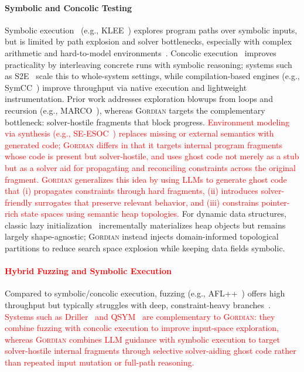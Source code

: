 \documentclass[acmsmall,screen,nonacm]{acmart}
\newcommand{\rev}[1]{\textcolor{red}{#1}}
\newcommand{\rev}[1]{#1}
\newcommand{\projName}{\textsc{Gordian}\xspace}
\theoremstyle{definition}
\begin{document}
\paragraph*{Symbolic and Concolic Testing} Symbolic execution~\cite{king1976symbolic} (e.g., KLEE~\cite{klee}) explores program paths over symbolic inputs, but is limited by path explosion and solver bottlenecks, especially with complex arithmetic and hard-to-model environments~\cite{env_modeling,autobug}. Concolic execution~\cite{dart} improves practicality by interleaving concrete runs with symbolic reasoning; systems such as S2E~\cite{s2e} scale this to whole-system settings, while compilation-based engines (e.g., SymCC~\cite{symcc}) improve throughput via native execution and lightweight instrumentation. Prior work addresses exploration blowups from loops and recursion (e.g., MARCO~\cite{hu2024marco}), whereas \projName targets the complementary bottleneck: solver-hostile fragments that block progress. \rev{Environment modeling via synthesis (e.g., SE-ESOC~\cite{mechtaev2018symbolic}) replaces missing or external semantics with generated code; \projName differs in that it targets internal program fragments whose code is present but solver-hostile, and uses ghost code not merely as a stub but as a solver aid for propagating and reconciling constraints across the original fragment. \projName generalizes this idea by using LLMs to generate ghost code that (i) propagates constraints through hard fragments, (ii) introduces solver-friendly surrogates that preserve relevant behavior, and (iii) constrains pointer-rich state spaces using semantic heap topologies. }For dynamic data structures, classic lazy initialization~\cite{visser2004test} incrementally materializes heap objects but remains largely shape-agnostic; \projName instead injects domain-informed topological partitions to reduce search space explosion while keeping data fields symbolic. 
\rev{\paragraph*{Hybrid Fuzzing and Symbolic Execution}} Compared to symbolic/concolic execution, fuzzing (e.g., AFL++~\cite{aflpp}) offers high throughput but typically struggles with deep, constraint-heavy branches~\cite{manes_fuzzing_survey}. \rev{Systems such as Driller~\cite{driller} and QSYM~\cite{qsym} are complementary to \projName{}: they combine fuzzing with concolic execution to improve input-space exploration, whereas \projName{} combines LLM guidance with symbolic execution to target solver-hostile internal fragments through selective solver-aiding ghost code rather than repeated input mutation or full-path reasoning.}
\end{document}
